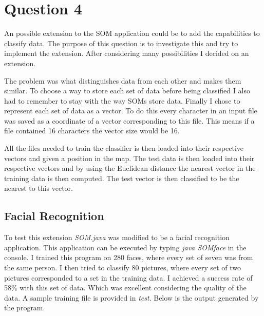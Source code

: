 \documentclass[a4paper,11pt,titlepage]{article}
\begin{document}
\section{Question 4}
An possible extension to the SOM application could be to add the capabilities to classify data. The purpose of this question is to investigate this and try to implement the extension. After considering many possibilities I decided on an extension.

The problem was what distinguishes data from each other and makes them similar. To choose a way to store each set of data before being classified I also had to remember to stay with the way SOMs store data. Finally I chose to represent each set of data as a vector. To do this every character in an input file was saved as a coordinate of a vector corresponding to this file. This means if a file contained 16 characters the vector size would be 16.

All the files needed to train the classifier is then loaded into their respective vectors and given a position in the map. The test data is then loaded into their respective vectors and by using the Euclidean distance the nearest vector in the training data is then computed. The test vector is then classified to be the nearest to this vector.
\subsection{Facial Recognition}
To test this extension \emph{SOM.java} was modified to be a facial recognition application. This application can be executed by typing \emph{java SOMface} in the console. I trained this program on 280 faces, where every set of seven was from the same person. I then tried to classify 80 pictures, where every set of two pictures corresponded to a set in the training data. I achieved a success rate of 58\% with this set of data. Which was excellent considering the quality of the data. A sample training file is provided in \emph{test}. Below is the output generated by the program.
\end{document}
